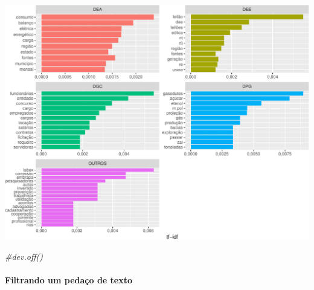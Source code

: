 \documentclass[]{article}
\newenvironment{Shaded}{\begin{snugshade}}{\end{snugshade}}
\newcommand{\KeywordTok}[1]{\textcolor[rgb]{0.13,0.29,0.53}{\textbf{#1}}}
\newcommand{\StringTok}[1]{\textcolor[rgb]{0.31,0.60,0.02}{#1}}
\newcommand{\CommentTok}[1]{\textcolor[rgb]{0.56,0.35,0.01}{\textit{#1}}}
\newcommand{\OperatorTok}[1]{\textcolor[rgb]{0.81,0.36,0.00}{\textbf{#1}}}
\newcommand{\NormalTok}[1]{#1}
\let\oldparagraph\paragraph
\renewcommand{\paragraph}[1]{\oldparagraph{#1}\mbox{}}
\begin{document}
\includegraphics{markdown_v30_files/figure-latex/02_freq_palavras_dir-1.pdf}

\begin{Shaded}
\begin{Highlighting}[]
\CommentTok{#dev.off()}
\end{Highlighting}
\end{Shaded}

\paragraph{Filtrando um pedaço de
texto}\label{filtrando-um-pedaco-de-texto}

\begin{Shaded}
\end{Shaded}
\end{document}
